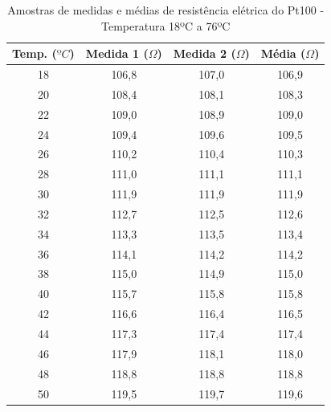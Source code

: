 \documentclass[a4paper]{instrumentacao}
\begin{document}
\begin{table}[H]
\centering
\caption{Amostras de medidas e médias de resistência elétrica do Pt100 - Temperatura 18ºC a 76ºC}
\label{tab:amostras-pt100}
\begin{tabular}{|c|c|c|c|}
\hline
\textbf{Temp. ($ºC$)} & \textbf{Medida 1 ($\Omega$)} & \textbf{Medida 2 ($\Omega$)} & \textbf{Média ($\Omega$)} \\ \hline
18                  & 106,8                 & 107,0                 & 106,9          \\ \hline
20                  & 108,4                 & 108,1                 & 108,3          \\ \hline
22                  & 109,0                 & 108,9                 & 109,0          \\ \hline
24                  & 109,4                 & 109,6                 & 109,5          \\ \hline
26                  & 110,2                 & 110,4                 & 110,3          \\ \hline
28                  & 111,0                 & 111,1                 & 111,1          \\ \hline
30                  & 111,9                 & 111,9                 & 111,9          \\ \hline
32                  & 112,7                 & 112,5                 & 112,6          \\ \hline
34                  & 113,3                 & 113,5                 & 113,4          \\ \hline
36                  & 114,1                 & 114,2                 & 114,2          \\ \hline
38                  & 115,0                 & 114,9                 & 115,0          \\ \hline
40                  & 115,7                 & 115,8                 & 115,8          \\ \hline
42                  & 116,6                 & 116,4                 & 116,5          \\ \hline
44                  & 117,3                 & 117,4                 & 117,4          \\ \hline
46                  & 117,9                 & 118,1                 & 118,0          \\ \hline
48                  & 118,8                 & 118,8                 & 118,8          \\ \hline
50                  & 119,5                 & 119,7                 & 119,6          \\ \hline

\end{tabular}
\end{table}
\end{document}
